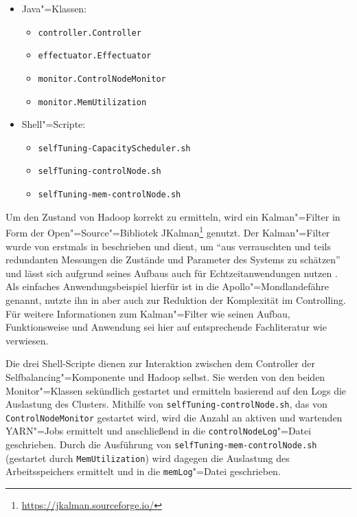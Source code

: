 \begin{itemize}
    \item Java"=Klassen:
    \begin{itemize}
        \item \texttt{controller.Controller}
        \item \texttt{effectuator.Effectuator}
        \item \texttt{monitor.ControlNodeMonitor}
        \item \texttt{monitor.MemUtilization}
    \end{itemize}
    \item Shell"=Scripte:
    \begin{itemize}
        \item \texttt{selfTuning-CapacityScheduler.sh}
        \item \texttt{selfTuning-controlNode.sh}
        \item \texttt{selfTuning-mem-controlNode.sh}
    \end{itemize}
\end{itemize}

Um den Zustand von Hadoop korrekt zu ermitteln, wird ein Kalman"=Filter in Form der Open"=Source"=Bibliotek JKalman\footnote{\url{https://jkalman.sourceforge.io/}} genutzt.
Der Kalman"=Filter wurde von \citeauthor{Kalman1960} erstmals in \cite{Kalman1960} beschrieben und dient, um \enquote{aus verrauschten und teils redundanten Messungen die Zustände und Parameter des Systems zu schätzen} und lässt sich aufgrund seines Aufbaus auch für Echtzeitanwendungen nutzen \cite{Marchthaler2017}.
Als einfaches Anwendungsbeispiel hierfür ist in \cite{Marchthaler2017} die Apollo"=Mondlandefähre genannt, \citeauthor{Strukov2001} nutzte ihn in \cite{Strukov2001} aber auch zur Reduktion der Komplexität im Controlling.
Für weitere Informationen zum Kalman"=Filter wie seinen Aufbau, Funktionsweise und Anwendung sei hier auf entsprechende Fachliteratur wie \zB \cite{Kim2016,Simon2006,Aggoun2004} verwiesen.

Die drei Shell-Scripte dienen zur Interaktion zwischen dem Controller der Selfbalancing"=Komponente und Hadoop selbst.
Sie werden von den beiden Monitor"=Klassen sekündlich gestartet und ermitteln basierend auf den Logs die Auslastung des Clusters.
Mithilfe von \texttt{selfTuning-controlNode.sh}, das von \texttt{ControlNodeMonitor} gestartet wird, wird die Anzahl an aktiven und wartenden YARN"=Jobs ermittelt und anschließend in die \texttt{controlNodeLog}"=Datei geschrieben.
Durch die Ausführung von \texttt{selfTuning-mem-controlNode.sh} (gestartet durch \texttt{MemUtilization}) wird dagegen die Auslastung des Arbeitsspeichers ermittelt und in die \texttt{memLog}"=Datei geschrieben.

